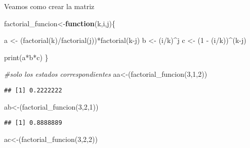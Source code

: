\documentclass[
]{article}
\newenvironment{Shaded}{\begin{snugshade}}{\end{snugshade}}
\newcommand{\CommentTok}[1]{\textcolor[rgb]{0.56,0.35,0.01}{\textit{#1}}}
\newcommand{\ControlFlowTok}[1]{\textcolor[rgb]{0.13,0.29,0.53}{\textbf{#1}}}
\newcommand{\DecValTok}[1]{\textcolor[rgb]{0.00,0.00,0.81}{#1}}
\newcommand{\FunctionTok}[1]{\textcolor[rgb]{0.00,0.00,0.00}{#1}}
\newcommand{\NormalTok}[1]{#1}
\newcommand{\OtherTok}[1]{\textcolor[rgb]{0.56,0.35,0.01}{#1}}
\newcommand{\SpecialCharTok}[1]{\textcolor[rgb]{0.00,0.00,0.00}{#1}}
\begin{document}
Veamos como crear la matriz

\begin{Shaded}
\begin{Highlighting}[]
\NormalTok{factorial\_funcion}\OtherTok{\textless{}{-}}\ControlFlowTok{function}\NormalTok{(k,i,j)\{}

\NormalTok{  a }\OtherTok{\textless{}{-}}\NormalTok{ (}\FunctionTok{factorial}\NormalTok{(k)}\SpecialCharTok{/}\FunctionTok{factorial}\NormalTok{(j))}\SpecialCharTok{*}\FunctionTok{factorial}\NormalTok{(k}\SpecialCharTok{{-}}\NormalTok{j)}
\NormalTok{  b }\OtherTok{\textless{}{-}}\NormalTok{ (i}\SpecialCharTok{/}\NormalTok{k)}\SpecialCharTok{\^{}}\NormalTok{j}
\NormalTok{  c }\OtherTok{\textless{}{-}}\NormalTok{ (}\DecValTok{1} \SpecialCharTok{{-}}\NormalTok{ (i}\SpecialCharTok{/}\NormalTok{k))}\SpecialCharTok{\^{}}\NormalTok{(k}\SpecialCharTok{{-}}\NormalTok{j)}
  
  \FunctionTok{print}\NormalTok{(a}\SpecialCharTok{*}\NormalTok{b}\SpecialCharTok{*}\NormalTok{c)}
\NormalTok{\} }
\end{Highlighting}
\end{Shaded}

\begin{Shaded}
\begin{Highlighting}[]
\CommentTok{\#solo los estados correspondientes}
\NormalTok{aa}\OtherTok{\textless{}{-}}\NormalTok{(}\FunctionTok{factorial\_funcion}\NormalTok{(}\DecValTok{3}\NormalTok{,}\DecValTok{1}\NormalTok{,}\DecValTok{2}\NormalTok{))}
\end{Highlighting}
\end{Shaded}

\begin{verbatim}
## [1] 0.2222222
\end{verbatim}

\begin{Shaded}
\begin{Highlighting}[]
\NormalTok{ab}\OtherTok{\textless{}{-}}\NormalTok{(}\FunctionTok{factorial\_funcion}\NormalTok{(}\DecValTok{3}\NormalTok{,}\DecValTok{2}\NormalTok{,}\DecValTok{1}\NormalTok{))}
\end{Highlighting}
\end{Shaded}

\begin{verbatim}
## [1] 0.8888889
\end{verbatim}

\begin{Shaded}
\begin{Highlighting}[]
\NormalTok{ac}\OtherTok{\textless{}{-}}\NormalTok{(}\FunctionTok{factorial\_funcion}\NormalTok{(}\DecValTok{3}\NormalTok{,}\DecValTok{2}\NormalTok{,}\DecValTok{2}\NormalTok{))}
\end{Highlighting}
\end{Shaded}
\end{document}
